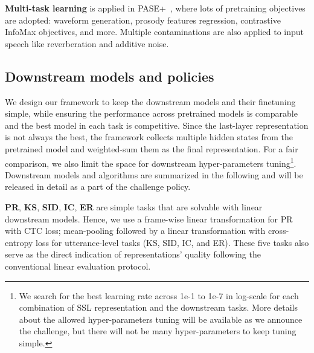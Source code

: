 \documentclass[a4paper]{article}
\begin{document}
\textbf{Multi-task learning} is applied in PASE+~\cite{pase+}, where lots of pretraining objectives are adopted: waveform generation, prosody features regression, contrastive InfoMax objectives, and more.
Multiple contaminations are also applied to input speech like reverberation and additive noise.

\subsection{Downstream models and policies}

We design our framework to keep the downstream models and their finetuning simple, while ensuring the performance across pretrained models is comparable and the best model in each task is competitive.
Since the last-layer representation is not always the best, the framework collects multiple hidden states from the pretrained model and weighted-sum them as the final representation.
For a fair comparison, we also limit the space for downstream hyper-parameters tuning\footnote{We search for the best learning rate across 1e-1 to 1e-7 in log-scale for each combination of SSL representation and the downstream tasks. More details about the allowed hyper-parameters tuning will be available as we announce the challenge, but there will not be many hyper-parameters to keep tuning simple.}.
Downstream models and algorithms are summarized in the following and will be released in detail as a part of the challenge policy.

\textbf{PR}, \textbf{KS}, \textbf{SID}, \textbf{IC}, \textbf{ER} are simple tasks that are solvable with linear downstream models.
Hence, we use a frame-wise linear transformation for PR with CTC loss; mean-pooling followed by a linear transformation with cross-entropy loss for utterance-level tasks (KS, SID, IC, and ER).
These five tasks also serve as the direct indication of representations' quality following the conventional linear evaluation protocol.
\end{document}
